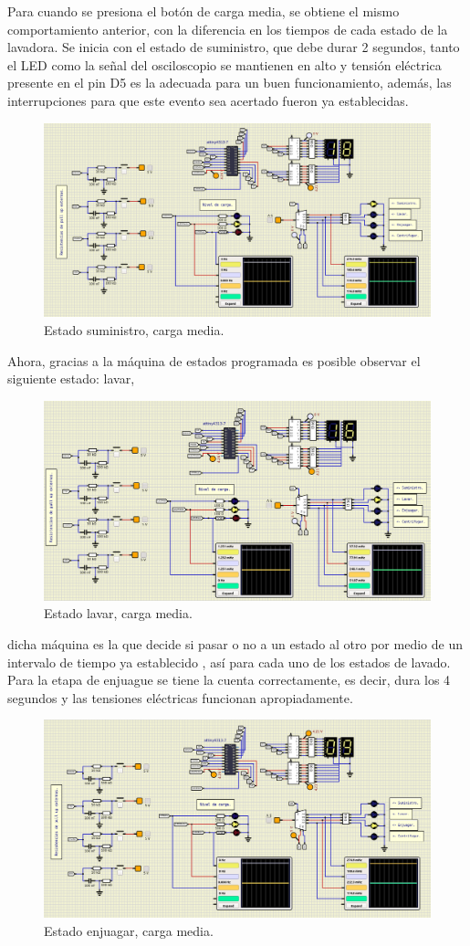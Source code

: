 Para cuando se presiona el botón de carga media, se obtiene el mismo comportamiento anterior, con la diferencia en los tiempos de cada estado de la lavadora. Se inicia con el estado de suministro, que debe durar 2 segundos, tanto el LED como la señal del osciloscopio se mantienen en alto y tensión eléctrica presente en el pin D5 es la adecuada para un buen funcionamiento, además, las interrupciones para que este evento sea acertado fueron ya establecidas. 
\begin{figure}[H]
        \centering
        \includegraphics[width=.7\linewidth]{Imagenes/14.png}
        \caption{Estado suministro, carga media.}
        \label{fig19}
    \end{figure}
Ahora, gracias a la máquina de estados programada es posible observar el siguiente estado: lavar, 
\begin{figure}[H]
        \centering
        \includegraphics[width=.7\linewidth]{Imagenes/14.1.png}
        \caption{Estado lavar, carga media.}
        \label{fig20}
    \end{figure}
dicha máquina es la que decide si pasar o no a un estado al otro por medio de un intervalo de tiempo ya establecido , así para cada uno de los estados de lavado. Para la etapa de enjuague se tiene la cuenta correctamente, es decir, dura los 4 segundos y las tensiones eléctricas funcionan apropiadamente.
\begin{figure}[H]
        \centering
        \includegraphics[width=.7\linewidth]{Imagenes/15.png}
        \caption{Estado enjuagar, carga media.}
        \label{fig21}
    \end{figure}

